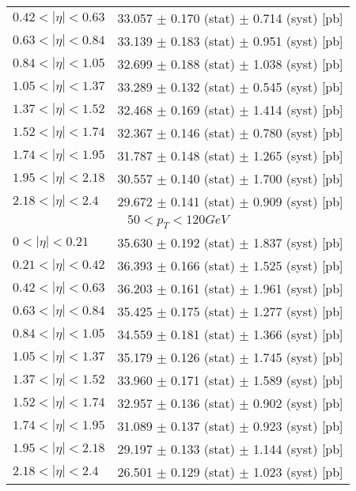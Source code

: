 \begin{tabular}{lc}
$0.42 < |\eta| <0.63$          & 33.057 $\pm$ 0.170 (stat) $\pm$ 0.714 (syst) [pb]  \\
$0.63 < |\eta| <0.84$          & 33.139 $\pm$ 0.183 (stat) $\pm$ 0.951 (syst) [pb]  \\
$0.84 < |\eta| <1.05$          & 32.699 $\pm$ 0.188 (stat) $\pm$ 1.038 (syst) [pb]  \\
$1.05 < |\eta| <1.37$          & 33.289 $\pm$ 0.132 (stat) $\pm$ 0.545 (syst) [pb]  \\
$1.37 < |\eta| <1.52$          & 32.468 $\pm$ 0.169 (stat) $\pm$ 1.414 (syst) [pb]  \\
$1.52 < |\eta| <1.74$          & 32.367 $\pm$ 0.146 (stat) $\pm$ 0.780 (syst) [pb]  \\
$1.74 < |\eta| <1.95$          & 31.787 $\pm$ 0.148 (stat) $\pm$ 1.265 (syst) [pb]  \\
$1.95 < |\eta| <2.18$          & 30.557 $\pm$ 0.140 (stat) $\pm$ 1.700 (syst) [pb]  \\
$2.18 < |\eta| <2.4$           & 29.672 $\pm$ 0.141 (stat) $\pm$ 0.909 (syst) [pb]  \\
\hline
\multicolumn{2}{c}{$50 < p_{T} < 120 GeV$} \\
\hline
$0 < |\eta| <0.21$             & 35.630 $\pm$ 0.192 (stat) $\pm$ 1.837 (syst) [pb]  \\
$0.21 < |\eta| <0.42$          & 36.393 $\pm$ 0.166 (stat) $\pm$ 1.525 (syst) [pb]  \\
$0.42 < |\eta| <0.63$          & 36.203 $\pm$ 0.161 (stat) $\pm$ 1.961 (syst) [pb]  \\
$0.63 < |\eta| <0.84$          & 35.425 $\pm$ 0.175 (stat) $\pm$ 1.277 (syst) [pb]  \\
$0.84 < |\eta| <1.05$          & 34.559 $\pm$ 0.181 (stat) $\pm$ 1.366 (syst) [pb]  \\
$1.05 < |\eta| <1.37$          & 35.179 $\pm$ 0.126 (stat) $\pm$ 1.745 (syst) [pb]  \\
$1.37 < |\eta| <1.52$          & 33.960 $\pm$ 0.171 (stat) $\pm$ 1.589 (syst) [pb]  \\
$1.52 < |\eta| <1.74$          & 32.957 $\pm$ 0.136 (stat) $\pm$ 0.902 (syst) [pb]  \\
$1.74 < |\eta| <1.95$          & 31.089 $\pm$ 0.137 (stat) $\pm$ 0.923 (syst) [pb]  \\
$1.95 < |\eta| <2.18$          & 29.197 $\pm$ 0.133 (stat) $\pm$ 1.144 (syst) [pb]  \\
$2.18 < |\eta| <2.4$           & 26.501 $\pm$ 0.129 (stat) $\pm$ 1.023 (syst) [pb]  \\
\hline
\end{tabular}

